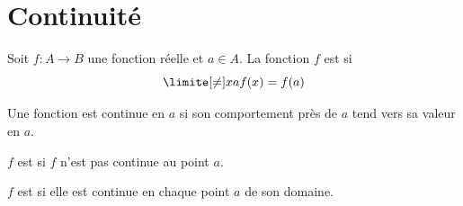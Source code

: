\section{Continuité}
\begin{frame}
  \begin{definition}
    Soit $f : A \to B$ une fonction réelle et $a \in A$. La fonction $f$ est  si
    \begin{equation*}
      \limite[\neq] x a f(x) = f(a)
    \end{equation*}
  \end{definition}
\begin{remark*}
  Une fonction est continue en \(a\) si son comportement près de \(a\) tend vers sa valeur en \(a\).
\end{remark*}

\begin{definition}
  $f$ est  si $f$ n'est pas continue au point $a$.
\end{definition}

\begin{definition}
  $f$ est  si elle est continue en chaque point $a$ de son domaine.
\end{definition}

\end{frame}

